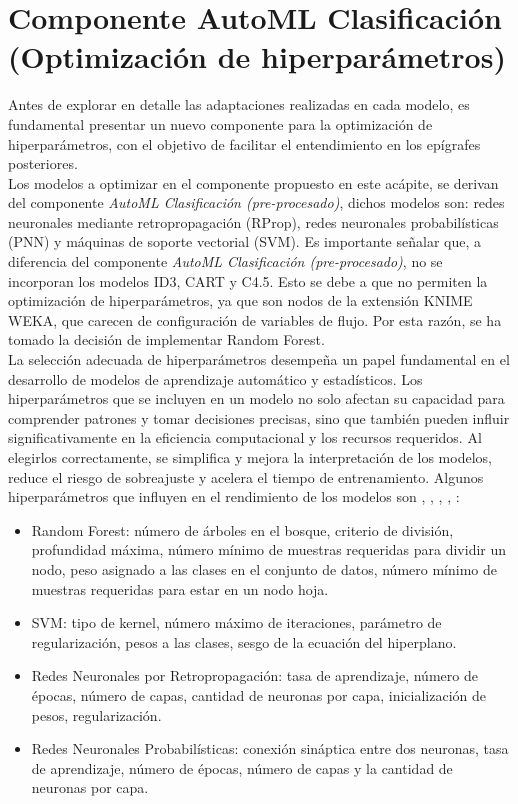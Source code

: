 \section{Componente AutoML Clasificación (Optimización de hiperparámetros)}
Antes de explorar en detalle las adaptaciones realizadas en cada modelo, es fundamental presentar un nuevo componente para la optimización de hiperparámetros, con el objetivo de facilitar el entendimiento en los epígrafes posteriores. \\
Los modelos a optimizar en el componente propuesto en este acápite, se derivan del componente \textit{AutoML Clasificación (pre-procesado)}, dichos modelos son: redes neuronales mediante retropropagación (RProp), redes neuronales probabilísticas (PNN) y máquinas de soporte vectorial (SVM). Es importante señalar que, a diferencia del componente \textit{AutoML Clasificación (pre-procesado)}, no se incorporan los modelos ID3, CART y C4.5. Esto se debe a que no permiten la optimización de hiperparámetros, ya que son nodos de la extensión KNIME WEKA, que carecen de configuración de variables de flujo. Por esta razón, se ha tomado la decisión de implementar Random Forest. \\
La selección adecuada de hiperparámetros desempeña un papel fundamental en el desarrollo de modelos de aprendizaje automático y estadísticos. Los hiperparámetros que se incluyen en un modelo no solo afectan su capacidad para comprender patrones y tomar decisiones precisas, sino que también pueden influir significativamente en la eficiencia computacional y los recursos requeridos. Al elegirlos correctamente, se simplifica y mejora la interpretación de los modelos, reduce el riesgo de sobreajuste y acelera el tiempo de entrenamiento. Algunos hiperparámetros que influyen en el rendimiento de los modelos son \citep{montavon2012neural}, \citep{scholkopf2018learning}, \citep{lakshmanan2021practical}, \citep{hastie2009elements}, \citep{gupta2017analysis}: 
\begin{itemize}
	\item Random Forest: número de árboles en el bosque, criterio de división, profundidad máxima, número mínimo de muestras requeridas para dividir un nodo, peso asignado a las clases en el conjunto de datos, número mínimo de muestras requeridas para estar en un nodo hoja.
	
	\item SVM: tipo de kernel, número máximo de iteraciones, parámetro de regularización, pesos a las clases, sesgo de la ecuación del hiperplano.
	
	\item Redes Neuronales por Retropropagación: tasa de aprendizaje, número de épocas, número de capas, cantidad de neuronas por capa, inicialización de pesos, regularización.
	
	\item Redes Neuronales Probabilísticas: conexión sináptica entre dos neuronas, tasa de aprendizaje, número de épocas, número de capas y la cantidad de neuronas por capa.
\end{itemize}

